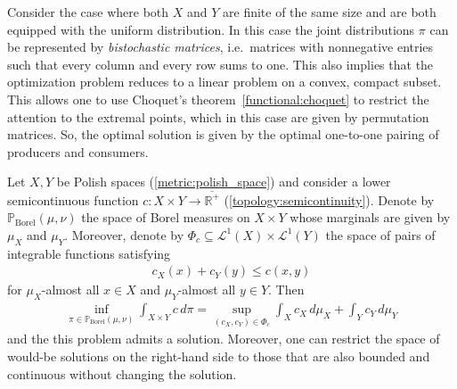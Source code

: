 
    \begin{example}
        Consider the case where both $X$ and $Y$ are finite of the same size and are both equipped with the uniform distribution. In this case the joint distributions $\pi$ can be represented by \textit{bistochastic matrices}, i.e.~matrices with nonnegative entries such that every column and every row sums to one. This also implies that the optimization problem reduces to a linear problem on a convex, compact subset. This allows one to use Choquet's theorem~\ref{functional:choquet} to restrict the attention to the extremal points, which in this case are given by permutation matrices. So, the optimal solution is given by the optimal one-to-one pairing of producers and consumers.
    \end{example}

    \begin{property}
        Let $X,Y$ be Polish spaces (\cref{metric:polish_space}) and consider a lower semicontinuous function $c:X\times Y\rightarrow\overline{\mathbb{R}^+}$ (\cref{topology:semicontinuity}). Denote by $\mathbb{P}_{\text{Borel}}(\mu,\nu)$ the space of Borel measures on $X\times Y$ whose marginals are given by $\mu_X$ and $\mu_Y$. Moreover, denote by $\Phi_c\subseteq\mathcal{L}^1(X)\times\mathcal{L}^1(Y)$ the space of pairs of integrable functions satisfying
        \begin{gather}
            c_X(x)+c_Y(y)\leq c(x,y)
        \end{gather}
        for $\mu_X$-almost all $x\in X$ and $\mu_Y$-almost all $y\in Y$. Then
        \begin{gather}
            \inf_{\pi\in\mathbb{P}_{\text{Borel}}(\mu,\nu)}\int_{X\times Y}c\,d\pi = \sup_{(c_X,c_Y)\in\Phi_c}\int_Xc_X\,d\mu_X+\int_Yc_Y\,d\mu_Y
        \end{gather}
        and the this problem admits a solution. Moreover, one can restrict the space of would-be solutions on the right-hand side to those that are also bounded and continuous without changing the solution.
    \end{property}

